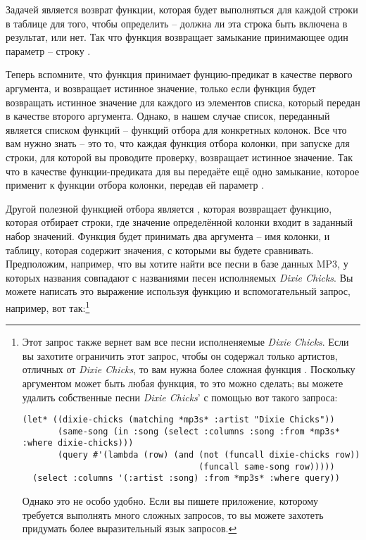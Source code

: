 Задачей  является возврат функции, которая будет выполняться для каждой
строки в таблице для того, чтобы определить -- должна ли эта строка быть включена в
результат, или нет.  Так что функция  возвращает замыкание принимающее один
параметр -- строку .

Теперь вспомните, что функция  принимает фунцию-предикат в качестве первого
аргумента, и возвращает истинное значение, только если функция будет возвращать истинное
значение для каждого из элементов списка, который передан  в качестве второго
аргумента.  Однако, в нашем случае список, переданный  является списком
функций -- функций отбора для конкретных колонок.  Все что вам нужно знать -- это то, что
каждая функция отбора колонки, при запуске для строки, для которой вы проводите проверку,
возвращает истинное значение.  Так что в качестве функции-предиката для  вы
передаёте ещё одно замыкание, которое применит  к функции отбора колонки,
передав ей параметр .

Другой полезной функцией отбора является , которая возвращает функцию, которая
отбирает строки, где значение определённой колонки входит в заданный набор значений.
Функция  будет принимать два аргумента -- имя колонки, и таблицу, которая
содержит значения, с которыми вы будете сравнивать.  Предположим, например, что вы хотите
найти все песни в базе данных MP3, у которых названия совпадают с названиями песен
исполняемых \textit{Dixie Chicks}.  Вы можете написать это выражение 
используя функцию  и вспомогательный запрос, например, вот так:\footnote{Этот
  запрос также вернет вам все песни исполненяемые \textit{Dixie Chicks}.  Если вы захотите
  ограничить этот запрос, чтобы он содержал только артистов, отличных от \textit{Dixie
    Chicks}, то вам нужна более сложная функция .  Поскольку аргументом
   может быть любая функция, то это можно сделать; вы можете удалить
  собственные песни \textit{Dixie Chicks}' с помощью вот такого запроса:

\begin{lstlisting}
(let* ((dixie-chicks (matching *mp3s* :artist "Dixie Chicks"))
       (same-song (in :song (select :columns :song :from *mp3s* :where dixie-chicks)))
       (query #'(lambda (row) (and (not (funcall dixie-chicks row)) 
                                   (funcall same-song row)))))
  (select :columns '(:artist :song) :from *mp3s* :where query))
\end{lstlisting}

Однако это не особо удобно.  Если вы пишете приложение, которому требуется выполнять много
сложных запросов, то вы можете захотеть придумать более выразительный язык запросов.}


